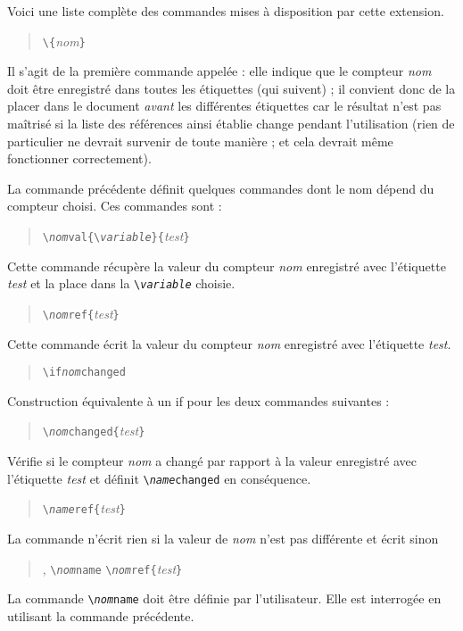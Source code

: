 \documentclass[pagesize=auto, parskip=half, headings=normal]{scrartcl}
\makeatletter
\newcommand*{\cs}[1]{\texttt{\textbackslash#1}}
\newcommand*{\cmd}[1]{\cs{\expandafter\@gobble\string#1}}
\newcommand*{\meta}[1]{\textlangle\textsl{#1}\textrangle}
\newcommand*{\marg}[1]{\texttt{\{}\meta{#1}\texttt{\}}}
\makeatother
\begin{document}
Voici une liste complète des commandes mises à disposition par cette
extension.
%
\begin{quote}
  \cmd{\addtoreflist}\marg{nom}
\end{quote}
%
Il s'agit de la première commande appelée : elle indique que le compteur
\meta{nom} doit être enregistré dans toutes les étiquettes (qui suivent) ;
il convient donc de la placer dans le document \emph{avant} les différentes
étiquettes car le résultat n'est pas maîtrisé si la liste des références
ainsi établie change pendant l'utilisation (rien de particulier ne devrait
survenir de toute manière ; et cela devrait même fonctionner correctement). 

La commande précédente définit quelques commandes dont le nom dépend du 
compteur choisi. Ces commandes sont :
%
\begin{quote}
  \cmd{\sget\meta{nom}val}\texttt{\{}\cs{\meta{variable}}\texttt{\}}\marg{test}
\end{quote}
%
Cette commande récupère la valeur du compteur \meta{nom} enregistré avec
l'étiquette \meta{test} et la place dans la \cs{\meta{variable}} choisie.

\begin{quote}
  \cs{\meta{nom}ref}\marg{test}
\end{quote}
%
Cette commande écrit la valeur du compteur \meta{nom} enregistré avec 
l'étiquette \meta{test}.

\begin{quote}
  \cs{if\meta{nom}changed}
\end{quote}
%

Construction équivalente à un \og if \fg pour les deux commandes suivantes :
%
\begin{quote}
  \cmd{\is\meta{nom}changed}\marg{test}
\end{quote}
%
Vérifie si le compteur \meta{nom} a changé par rapport à la valeur
enregistré avec l'étiquette \meta{test} et définit \cs{\meta{name}changed}
en conséquence. 

\begin{quote}
  \cmd{\s\meta{name}ref}\marg{test}
\end{quote}
%
La commande n'écrit rien si la valeur de \meta{nom} n'est pas différente
et écrit sinon 
%
\begin{quote}
  \ttfamily
  , \cmd{\short\meta{nom}name} \cs{\meta{nom}ref}\marg{test}
\end{quote}
%
La commande \cmd{\short\meta{nom}name} doit être définie par l'utilisateur.
Elle est interrogée en utilisant la commande précédente.
\end{document}
